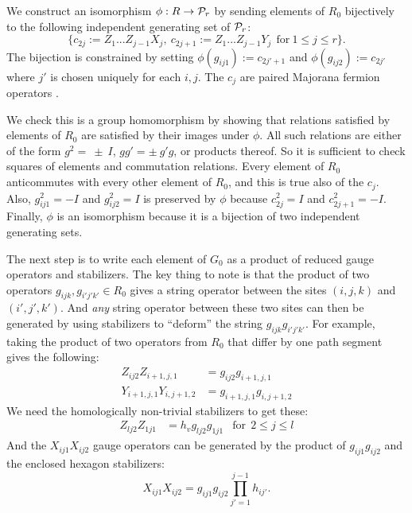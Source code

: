 We construct an isomorphism $\phi: R\to \mathcal{P}_r$
by sending elements of $R_0$ bijectively
to the following independent generating
set of $\mathcal{P}_r$:
$$
\big\{c_{2j}:=Z_1...Z_{j-1} X_j,\ c_{2j+1}:=Z_1...Z_{j-1} Y_j\ \ \mbox{for}\ 1\le j\le r\big\}.
$$
The bijection is constrained 
by setting $\phi(g_{ij1}):=c_{2j'+1}$
and $\phi(g_{ij2}):=c_{2j'}$
where $j'$ is chosen uniquely for each $i, j.$
The $c_j$ are paired Majorana fermion operators  \cite{Jordan1928, Kitaev2006}.


We check this is a group homomorphism by showing that relations
satisfied by elements of $R_0$ are satisfied by
their images under $\phi.$
All such relations are either of the form
$g^2=~\pm~I$, $gg'=\pm~g'g$, or
products thereof.
So it is sufficient to check squares of
elements and commutation relations.
Every element of $R_0$ anticommutes with
every other element of $R_0$, and this is true also
of the $c_j.$
Also, $g_{ij1}^2=-I$ and $g_{ij2}^2=I$ 
is preserved by $\phi$ because $c_{2j}^2=I$ and $c_{2j+1}^2=-I$.
Finally, $\phi$ is an isomorphism
because it is a bijection of two independent
generating sets.

The next step is to write each element of $G_0$
as a product of reduced gauge operators and stabilizers.
The key thing to note is that the product of two
operators $g_{ijk}, g_{i'j'k'}\in R_0$ gives a string
operator between the sites $(i,j,k)$ and $(i',j',k')$.
And {\it any} string operator between these
two sites can then be generated by using stabilizers to
``deform'' the string $g_{ijk}g_{i'j'k'}.$
For example, taking the product
of two operators from $R_0$ that differ
by one path segment gives the following:
\begin{align*}
Z_{ij2}Z_{i+1,j,1} &= g_{ij2} g_{i+1,j,1} \\
Y_{i+1,j,1}Y_{i,j+1,2} &= g_{i+1,j,1}g_{i,j+1,2}
\end{align*}
We need the homologically non-trivial stabilizers to get these:
\begin{align*}
Z_{lj2}Z_{1j1} &= h_v g_{lj2} g_{1j1} &\mbox{for}\ \  2\le j\le l
\end{align*}
And the $X_{ij1}X_{ij2}$
gauge operators can be generated
by the product of 
$g_{ij1}g_{ij2}$ and the enclosed hexagon stabilizers:
$$X_{ij1}X_{ij2}=g_{ij1}g_{ij2}\prod_{j'=1}^{j-1} h_{ij'}.$$

